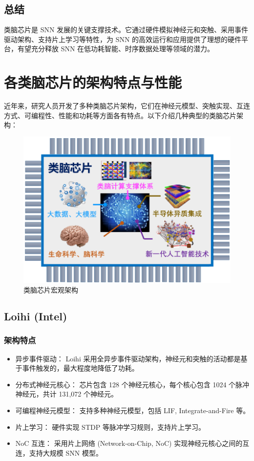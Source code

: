 \documentclass[12pt, a4paper, oneside]{ctexart}
\numberwithin{equation}{section}  %
\begin{document}
\subsection{总结}
类脑芯片是 SNN 发展的关键支撑技术。它通过硬件模拟神经元和突触、采用事件驱动架构、支持片上学习等特性，为 SNN 的高效运行和应用提供了理想的硬件平台，有望充分释放 SNN 在低功耗智能、时序数据处理等领域的潜力。
\section{各类脑芯片的架构特点与性能}
近年来，研究人员开发了多种类脑芯片架构，它们在神经元模型、突触实现、互连方式、可编程性、性能和功耗等方面各有特点。以下介绍几种典型的类脑芯片架构\cite{ref9}：
\begin{figure}[htbp]
    \centering
    \includegraphics[width=0.8\linewidth]{5.png}
    \caption{类脑芯片宏观架构}
\end{figure}
\subsection{Loihi (Intel)}
\subsubsection{架构特点}
\begin{itemize}
    \item 异步事件驱动： Loihi 采用全异步事件驱动架构，神经元和突触的活动都是基于事件触发的，最大程度地降低了功耗。
    \item 分布式神经元核心： 芯片包含 128 个神经元核心，每个核心包含 1024 个脉冲神经元，共计 131,072 个神经元。
    \item 可编程神经元模型： 支持多种神经元模型，包括 LIF, Integrate-and-Fire 等。
    \item 片上学习： 硬件实现 STDP 等脉冲学习规则，支持片上学习。
    \item NoC 互连： 采用片上网络 (Network-on-Chip, NoC) 实现神经元核心之间的互连，支持大规模 SNN 模型。
\end{itemize}
\end{document}
